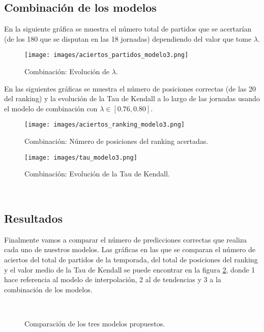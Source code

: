 \newpage

\subsection{Combinación de los modelos}
En la siguiente gráfica se muestra el número total de partidos que se acertarían (de los 180 que se disputan en las 18 jornadas) dependiendo del valor que tome $\lambda$.
\begin{figure}[H]
	\centering
	\texttt{[image: images/aciertos\_partidos\_modelo3.png]}
	\caption{Combinación: Evolución de $\lambda$.} \label{fig:evol_lambda}
\end{figure}

En las siguientes gráficas se muestra el número de posiciones correctas (de las 20 del ranking) y la evolución de la Tau de Kendall a lo largo de las jornadas usando el modelo de combinación con $\lambda \in [0.76,0.80]$.
\begin{figure}[H]
	\centering
	\texttt{[image: images/aciertos\_ranking\_modelo3.png]}
	\caption{Combinación: Número de posiciones del ranking acertadas.}
\end{figure}
 
\begin{figure}[H]
	\centering
	\texttt{[image: images/tau\_modelo3.png]}
	\caption{Combinación: Evolución de la Tau de Kendall.}
\end{figure}

\ \\

\newpage

\subsection{Resultados}
Finalmente vamos a comparar el número de predicciones correctas que realiza cada uno de nuestros modelos. Las gráficas en las que se comparan el número de aciertos del total de partidos de la temporada, del total de posiciones del ranking y el valor medio de la Tau de Kendall se puede encontrar en la figura \ref{fig:comparacion_modelos}, donde 1 hace referencia al modelo de interpolación, 2 al de tendencias y 3 a la combinación de los modelos.\\

\begin{figure}[H]
	\centering
	\\
	\caption{Comparación de los tres modelos propuestos.} \label{fig:comparacion_modelos}
\end{figure} 

